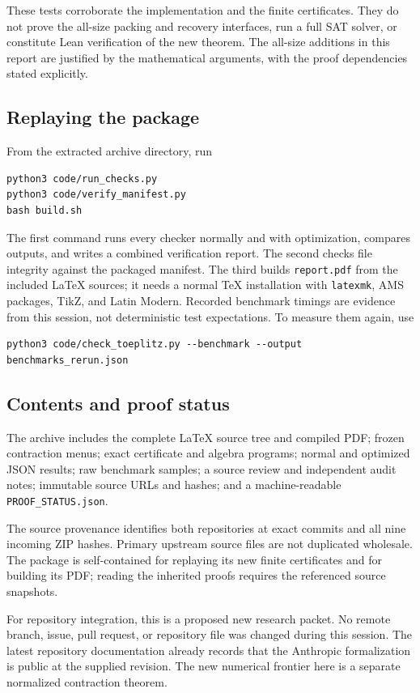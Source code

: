 These tests corroborate the implementation and the finite certificates.
They do not prove the all-size packing and recovery interfaces, run a full
SAT solver, or constitute Lean verification of the new theorem. The
all-size additions in this report are justified by the mathematical
arguments, with the proof dependencies stated explicitly.

\subsection{Replaying the package}
From the extracted archive directory, run
\begin{lstlisting}
python3 code/run_checks.py
python3 code/verify_manifest.py
bash build.sh
\end{lstlisting}
The first command runs every checker normally and with optimization,
compares outputs, and writes a combined verification report. The second
checks file integrity against the packaged manifest. The third builds
\texttt{report.pdf} from the included \LaTeX{} sources; it needs a normal
TeX installation with \texttt{latexmk}, AMS packages, TikZ, and Latin Modern.
Recorded benchmark timings are evidence from this session, not deterministic
test expectations. To measure them again, use
\begin{lstlisting}
python3 code/check_toeplitz.py --benchmark --output benchmarks_rerun.json
\end{lstlisting}

\subsection{Contents and proof status}
The archive includes the complete \LaTeX{} source tree and compiled PDF;
frozen contraction menus; exact certificate and algebra programs; normal
and optimized JSON results; raw benchmark samples; a source review and
independent audit notes; immutable source URLs and hashes; and a
machine-readable \texttt{PROOF\_STATUS.json}.

The source provenance identifies both repositories at exact commits and
all nine incoming ZIP hashes. Primary upstream source files are not
duplicated wholesale. The package is self-contained for replaying its
new finite certificates and for building its PDF; reading the inherited
proofs requires the referenced source snapshots.

For repository integration, this is a proposed new research packet. No
remote branch, issue, pull request, or repository file was changed during
this session. The latest repository documentation already records that the
Anthropic formalization is public at the supplied revision. The new
numerical frontier here is a separate normalized contraction theorem.
